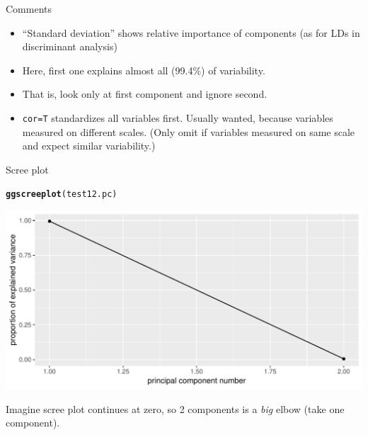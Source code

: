\documentclass[unknownkeysallowed]{beamer}\usepackage[]{graphicx}\usepackage[]{color}
\makeatletter
\def\maxwidth{ %
  \ifdim\Gin@nat@width>\linewidth
    \linewidth
  \else
    \Gin@nat@width
  \fi
}
\newcommand{\hlstd}[1]{\textcolor[rgb]{0.345,0.345,0.345}{#1}}%
\newcommand{\hlkwd}[1]{\textcolor[rgb]{0.737,0.353,0.396}{\textbf{#1}}}%
\newenvironment{kframe}{%
 \def\at@end@of@kframe{}%
 \ifinner\ifhmode%
  \def\at@end@of@kframe{\end{minipage}}%
  \begin{minipage}{\columnwidth}%
 \fi\fi%
 \def\FrameCommand##1{\hskip\@totalleftmargin \hskip-\fboxsep
 \colorbox{shadecolor}{##1}\hskip-\fboxsep
     \hskip-\linewidth \hskip-\@totalleftmargin \hskip\columnwidth}%
 \MakeFramed {\advance\hsize-\width
   \@totalleftmargin\z@ \linewidth\hsize
   \@setminipage}}%
 {\par\unskip\endMakeFramed%
 \at@end@of@kframe}
\newenvironment{knitrout}{}{} %
\makeatother
\begin{document}
\begin{frame}[fragile]{Comments}
\begin{itemize}
\item ``Standard deviation'' shows relative importance of components
  (as for LDs in discriminant analysis)
\item Here, first one explains almost all (99.4\%) of variability.
\item That is, look only at first component and ignore second.
\item \texttt{cor=T} standardizes all variables first. Usually wanted,
  because variables measured on different scales. (Only omit if
  variables measured on same scale and expect similar variability.)
\end{itemize}
  
\end{frame}


  

\begin{frame}[fragile]{Scree plot}
  
\begin{knitrout}
\color{fgcolor}\begin{kframe}
\begin{alltt}
\hlkwd{ggscreeplot}\hlstd{(test12.pc)}
\end{alltt}
\end{kframe}
\includegraphics[width=\maxwidth]{figure/unnamed-chunk-450-1} 

\end{knitrout}

Imagine scree plot continues at zero, so 2 components is a \emph{big}
elbow (take one component).

\end{frame}
\end{document}
